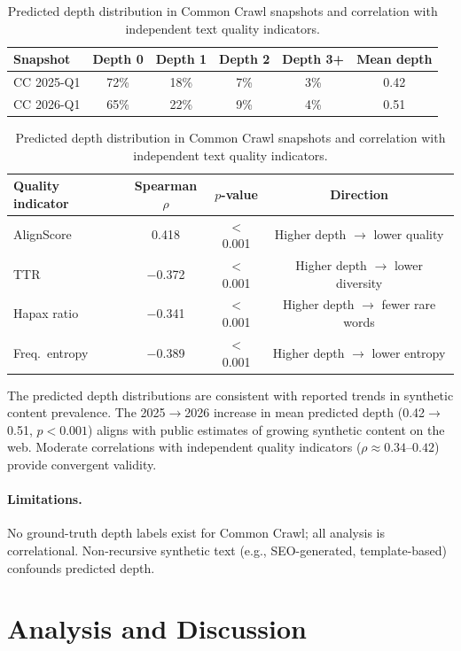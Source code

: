 \documentclass[11pt]{article}
\begin{document}
\begin{table}[t]
\centering
\caption{Predicted depth distribution in Common Crawl snapshots and correlation with independent text quality indicators.}
\label{tab:cc}
\small
\begin{tabular}{lccccc}
\toprule
\textbf{Snapshot} & \textbf{Depth 0} & \textbf{Depth 1} & \textbf{Depth 2} & \textbf{Depth 3+} & \textbf{Mean depth} \\
\midrule
CC 2025-Q1 & 72\% & 18\% & 7\% & 3\% & 0.42 \\
CC 2026-Q1 & 65\% & 22\% & 9\% & 4\% & 0.51 \\
\bottomrule
\end{tabular}
\vspace{6pt}
\begin{tabular}{lccc}
\toprule
\textbf{Quality indicator} & \textbf{Spearman $\rho$} & \textbf{$p$-value} & \textbf{Direction} \\
\midrule
AlignScore & 0.418 & $<$0.001 & Higher depth $\to$ lower quality \\
TTR & $-$0.372 & $<$0.001 & Higher depth $\to$ lower diversity \\
Hapax ratio & $-$0.341 & $<$0.001 & Higher depth $\to$ fewer rare words \\
Freq.\ entropy & $-$0.389 & $<$0.001 & Higher depth $\to$ lower entropy \\
\bottomrule
\end{tabular}
\end{table}

The predicted depth distributions are consistent with reported trends in synthetic content prevalence. The 2025$\to$2026 increase in mean predicted depth (0.42$\to$0.51, $p < 0.001$) aligns with public estimates of growing synthetic content on the web. Moderate correlations with independent quality indicators ($\rho \approx 0.34$--$0.42$) provide convergent validity.

\paragraph{Limitations.} No ground-truth depth labels exist for Common Crawl; all analysis is correlational. Non-recursive synthetic text (e.g., SEO-generated, template-based) confounds predicted depth.

\section{Analysis and Discussion}
\label{sec:discussion}
\end{document}
